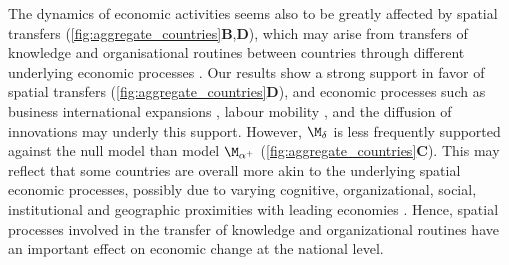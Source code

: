 The dynamics of economic activities seems also to be greatly affected by spatial transfers (\cref{fig:aggregate_countries}\textbf{B},\textbf{D}), which may arise from transfers of knowledge and organisational routines between countries \cite{Hodgson2019} through different underlying economic processes \citep{Zahra2000,Zahra2000,RogersEverettM2003DoI,Boschma2008}. 
% 
Our results show a strong support in favor of spatial transfers (\cref{fig:aggregate_countries}\textbf{D}), and economic processes such as business international expansions \citep{Zahra2000}, labour mobility \citep{Zahra2000}, and the diffusion of innovations \citep{Boschma2008} may underly this support. However, $\moddelta$ is less frequently supported against the null model than model $\modalphap$ (\cref{fig:aggregate_countries}\textbf{C}). This may reflect that some countries are overall more akin to the underlying spatial economic processes, possibly due to varying cognitive, organizational, social, institutional and geographic proximities with leading economies \citep{Boschma2005}.
% 
Hence, spatial processes involved in the transfer of knowledge and organizational routines have an important effect on economic change at the national level.

